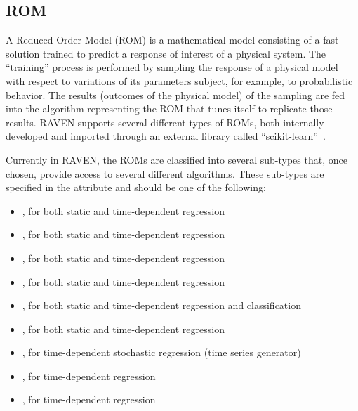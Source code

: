 \newcommand{\zNormalizationPerformed}[1]
{
  \textcolor{red}{\\It is important to NOTE that RAVEN uses a Z-score normalization of the training data before
  constructing the \textit{#1} ROM:
\begin{equation}
  \mathit{\mathbf{X'}} = \frac{(\mathit{\mathbf{X}}-\mu )}{\sigma }
\end{equation}
 }
}

\newcommand{\zNormalizationNotPerformed}[1]
{
  \textcolor{red}{
  \\It is important to NOTE that RAVEN does not pre-normalize the training data before
  constructing the \textit{#1} ROM.}
}

\subsection{ROM}
\label{subsec:models_ROM}
A Reduced Order Model (ROM) is a mathematical model consisting of a fast
solution trained to predict a response of interest of a physical system.
%
The ``training'' process is performed by sampling the response of a physical
model with respect to variations of its parameters subject, for example, to
probabilistic behavior.
%
The results (outcomes of the physical model) of the sampling are fed into the
algorithm representing the ROM that tunes itself to replicate those results.
%
RAVEN supports several different types of ROMs, both internally developed and
imported through an external library called ``scikit-learn''~\cite{SciKitLearn}.

Currently in RAVEN, the ROMs are classified into several sub-types that, once chosen,
provide access to several different algorithms.
%
These sub-types are specified in the  attribute and should be
one of the following:
\begin{itemize}
  \item {}, for both static and time-dependent regression
  \item {}, for both static and time-dependent regression
  \item {}, for both static and time-dependent regression
  \item {}, for both static and time-dependent regression
  \item {}, for both static and time-dependent regression and classification
  \item {}, for both static and time-dependent regression
  \item {}, for time-dependent stochastic regression (time series generator)
  \item {}, for time-dependent regression
  \item {}, for time-dependent regression
\end{itemize}

